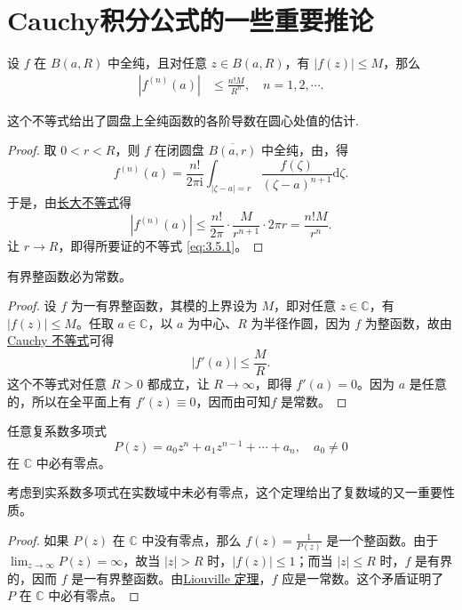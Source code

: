 \documentclass[../../main.tex]{subfiles}
\begin{document}
\section{Cauchy积分公式的一些重要推论}

\begin{theorem}[Cauchy不等式]\label{theorem:Cauchy不等式-复变函数}
设 \( f \) 在 \( B(a,R) \) 中全纯，且对任意 \( z \in B(a,R) \)，有 \( |f(z)| \leqslant M \)，那么
\begin{align}
|f^{(n)}(a)| &\leqslant \frac{n!M}{R^n}, \quad n = 1,2,\cdots. \label{eq:3.5.1}
\end{align}
\end{theorem}
\begin{note}
这个不等式给出了圆盘上全纯函数的各阶导数在圆心处值的估计.
\end{note}
\begin{proof}
取 \( 0 < r < R \)，则 \( f \) 在闭圆盘 \( \overline{B(a,r)} \) 中全纯，由，得
\[
f^{(n)}(a) = \frac{n!}{2\pi \mathrm{i}} \int_{|\zeta - a| = r} \frac{f(\zeta)}{(\zeta - a)^{n + 1}} \mathrm{d}\zeta.
\]
于是，由\hyperref[proposition:长大不等式]{长大不等式}得
\[
|f^{(n)}(a)| \leqslant \frac{n!}{2\pi} \cdot \frac{M}{r^{n + 1}} \cdot 2\pi r = \frac{n!M}{r^n}.
\]
让 \( r \to R \)，即得所要证的不等式 \eqref{eq:3.5.1}。
\end{proof}

\begin{theorem}[Liouville定理]\label{theorem:Liouville(刘维尔)定理}
有界整函数必为常数。
\end{theorem}
\begin{proof}
设 \( f \) 为一有界整函数，其模的上界设为 \( M \)，即对任意 \( z \in \mathbb{C} \)，有 \( |f(z)| \leqslant M \)。任取 \( a \in \mathbb{C} \)，以 \( a \) 为中心、\( R \) 为半径作圆，因为 \( f \) 为整函数，故由 \hyperref[theorem:Cauchy不等式-复变函数]{Cauchy 不等式}可得
\[
|f'(a)| \leqslant \frac{M}{R}.
\]
这个不等式对任意 \( R > 0 \) 都成立，让 \( R \to \infty \)，即得 \( f'(a) = 0 \)。因为 \( a \) 是任意的，所以在全平面上有 \( f'(z) \equiv 0 \)，因而由可知\( f \) 是常数。
\end{proof}

\begin{theorem}[代数学基本定理]\label{theorem:代数学基本定理}
任意复系数多项式
\[
P(z) = a_0 z^n + a_1 z^{n - 1} + \cdots + a_n, \quad a_0 \neq 0
\]
在 \( \mathbb{C} \) 中必有零点。
\end{theorem}
\begin{note}
考虑到实系数多项式在实数域中未必有零点，这个定理给出了复数域的又一重要性质。
\end{note}
\begin{proof}
如果 \( P(z) \) 在 \( \mathbb{C} \) 中没有零点，那么 \( f(z) = \frac{1}{P(z)} \) 是一个整函数。由于 \( \lim_{z \to \infty} P(z) = \infty \)，故当 \( |z| > R \) 时，\( |f(z)| \leqslant 1 \)；而当 \( |z| \leqslant R \) 时，\( f \) 是有界的，因而 \( f \) 是一有界整函数。由\hyperref[theorem:Liouville(刘维尔)定理]{Liouville 定理}，\( f \) 应是一常数。这个矛盾证明了 \( P \) 在 \( \mathbb{C} \) 中必有零点。
\end{proof}
\end{document}
